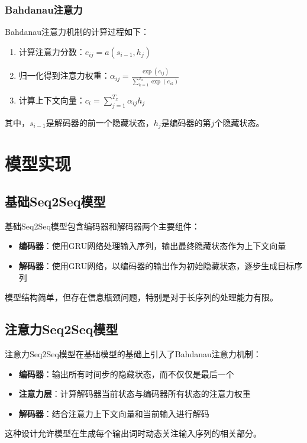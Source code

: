 \documentclass[a4paper]{article}
\begin{document}
\subsubsection{Bahdanau注意力}
Bahdanau注意力机制的计算过程如下：
\begin{enumerate}
    \item 计算注意力分数：$e_{ij} = a(s_{i-1}, h_j)$
    \item 归一化得到注意力权重：$\alpha_{ij} = \frac{\exp(e_{ij})}{\sum_{k=1}^{T_x} \exp(e_{ik})}$
    \item 计算上下文向量：$c_i = \sum_{j=1}^{T_x} \alpha_{ij} h_j$
\end{enumerate}

其中，$s_{i-1}$是解码器的前一个隐藏状态，$h_j$是编码器的第$j$个隐藏状态。

\section{模型实现}
\subsection{基础Seq2Seq模型}
基础Seq2Seq模型包含编码器和解码器两个主要组件：
\begin{itemize}
    \item \textbf{编码器}：使用GRU网络处理输入序列，输出最终隐藏状态作为上下文向量
    \item \textbf{解码器}：使用GRU网络，以编码器的输出作为初始隐藏状态，逐步生成目标序列
\end{itemize}

模型结构简单，但存在信息瓶颈问题，特别是对于长序列的处理能力有限。

\subsection{注意力Seq2Seq模型}
注意力Seq2Seq模型在基础模型的基础上引入了Bahdanau注意力机制：
\begin{itemize}
    \item \textbf{编码器}：输出所有时间步的隐藏状态，而不仅仅是最后一个
    \item \textbf{注意力层}：计算解码器当前状态与编码器所有状态的注意力权重
    \item \textbf{解码器}：结合注意力上下文向量和当前输入进行解码
\end{itemize}

这种设计允许模型在生成每个输出词时动态关注输入序列的相关部分。
\end{document}
